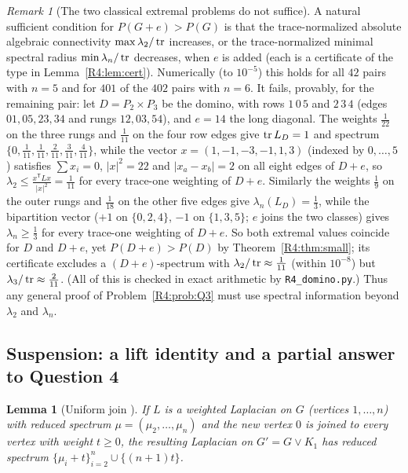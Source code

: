 \documentclass[11pt]{amsart}
\newtheorem{lemma}[theorem]{Lemma}
\theoremstyle{definition}
\theoremstyle{remark}
\newtheorem{remark}[theorem]{Remark}
\begin{document}
\begin{remark}[The two classical extremal problems do not suffice]\label{R4:rem:dichotomy}
A natural sufficient condition for $P(G+e)>P(G)$ is that the
trace-normalized absolute algebraic connectivity $\max\lambda_2/\operatorname{tr}$
increases, or the trace-normalized minimal spectral radius
$\min\lambda_n/\operatorname{tr}$ decreases, when $e$ is added (each is a certificate of
the type in Lemma~\ref{R4:lem:cert}).  Numerically (to $10^{-5}$) this
holds for all $42$ pairs with $n=5$ and for $401$ of the $402$ pairs with
$n=6$.  It fails, provably, for the remaining pair: let $D=P_2\times P_3$
be the domino, with rows $1\,0\,5$ and $2\,3\,4$ (edges
$01,05,23,34$ and rungs $12,03,54$), and $e=14$ the long diagonal.  The
weights $\tfrac1{22}$ on the three rungs and $\tfrac1{11}$ on the four row
edges give $\operatorname{tr} L_D=1$ and spectrum $\{0,\tfrac1{11},\tfrac1{11},\tfrac2{11},
\tfrac3{11},\tfrac4{11}\}$, while the vector $x=(1,-1,-3,-1,1,3)$ (indexed
by $0,\dots,5$) satisfies $\sum x_i=0$, $|x|^2=22$ and $|x_a-x_b|=2$ on all
eight edges of $D+e$, so $\lambda_2\le\frac{x^{\mathsf T}Lx}{|x|^2}=\frac1{11}$
for every trace-one weighting of $D+e$.  Similarly the weights
$\tfrac19$ on the outer rungs and $\tfrac1{18}$ on the other five edges give
$\lambda_n(L_D)=\tfrac13$, while the bipartition vector
($+1$ on $\{0,2,4\}$, $-1$ on $\{1,3,5\}$; $e$ joins the two classes) gives
$\lambda_n\ge\frac13$ for every trace-one weighting of $D+e$.  So both
extremal values coincide for $D$ and $D+e$, yet $P(D+e)>P(D)$ by
Theorem~\ref{R4:thm:small}; its certificate excludes a $(D+e)$-spectrum
with $\lambda_2/\operatorname{tr}\approx\frac1{11}$ (within $10^{-8}$) but
$\lambda_3/\operatorname{tr}\approx\frac2{11}$.  (All of
this is checked in exact arithmetic by \texttt{R4\_\allowbreak{}domino.py}.)  Thus any
general proof of Problem~\ref{R4:prob:Q3} must use spectral information
beyond $\lambda_2$ and $\lambda_n$.
\end{remark}

\subsection{Suspension: a lift identity and a partial answer to Question 4}
\label{R4:subsec:Q4}

\begin{lemma}[Uniform join {\cite[Lemma~7.3]{R4-EJT}}]\label{R4:lem:join}
If $L$ is a weighted Laplacian on $G$ (vertices $1,\dots,n$) with reduced
spectrum $\mu=(\mu_2,\dots,\mu_n)$ and the new vertex $0$ is joined to every
vertex with weight $t\ge0$, the resulting Laplacian on $G'=G\vee K_1$ has
reduced spectrum $\{\mu_i+t\}_{i=2}^n\cup\{(n+1)t\}$.
\end{lemma}
\end{document}
